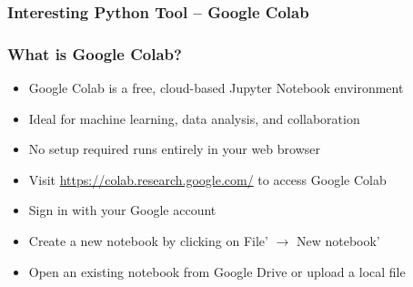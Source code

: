 \documentclass{beamer}
\begin{document}
    \subsubsection{Interesting Python Tool -- Google Colab}
    \begin{frame}
        \frametitle{What is Google Colab?}
        \begin{itemize}
            \item Google Colab is a free, cloud-based Jupyter Notebook environment
            \item Ideal for machine learning, data analysis, and collaboration
            \item No setup required runs entirely in your web browser
            \item Visit \url{https://colab.research.google.com/} to access Google Colab
            \item Sign in with your Google account
            \item Create a new notebook by clicking on File' $\rightarrow$ New notebook'
            \item Open an existing notebook from Google Drive or upload a local file
        \end{itemize}
    \end{frame}
\end{document}
